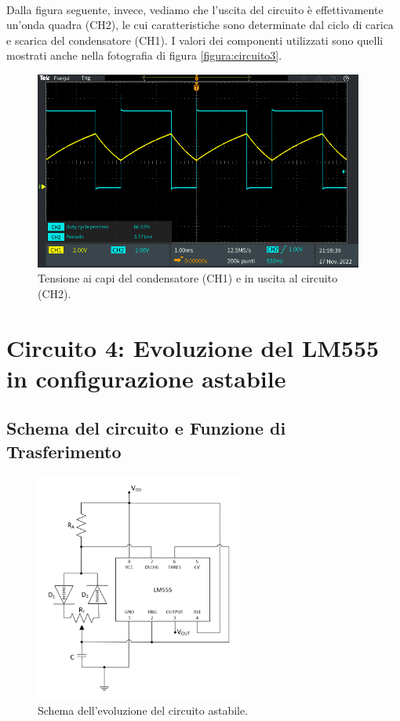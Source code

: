 \documentclass{report}
\begin{document}
\\Dalla figura seguente, invece, vediamo che l'uscita del circuito è effettivamente un'onda quadra (CH2), le cui caratteristiche sono determinate dal ciclo di carica e scarica del condensatore (CH1). I valori dei componenti utilizzati sono quelli mostrati anche nella fotografia di figura \ref{figura:circuito3}.
\begin{figure}[h!]
	\centering
	\includegraphics[height=6.5cm]{immagini/TEK00019}
	\caption{Tensione ai capi del condensatore (CH1) e in uscita al circuito (CH2).}
	\label{figura:TEK00019}
\end{figure}
\newpage
\section{Circuito 4: Evoluzione del LM555 in configurazione astabile}
\subsection{Schema del circuito e Funzione di Trasferimento}
\begin{figure}[h!]
	\centering
	\includegraphics[height=7.5cm]{immagini/schema4}
	\caption{Schema dell'evoluzione del circuito astabile.}
	\label{figura:schema4}
\end{figure}
\end{document}
